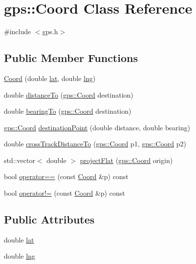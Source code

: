 \hypertarget{classgps_1_1Coord}{}\section{gps\+:\+:Coord Class Reference}
\label{classgps_1_1Coord}


{\ttfamily \#include $<$gps.\+h$>$}

\subsection*{Public Member Functions}
\begin{DoxyCompactItemize}
\item 
\hyperlink{classgps_1_1Coord_afcc45fae837b48cd7d9bd545c4dc574c}{Coord} (double \hyperlink{classgps_1_1Coord_a17cbbd7580a83c42f650b8f93e14d98e}{lat}, double \hyperlink{classgps_1_1Coord_abca98aaabe2dc3cf50ebdd687c2f47e8}{lng})
\item 
double \hyperlink{classgps_1_1Coord_a335589710eec94e6062323ef5c8994ab}{distance\+To} (\hyperlink{classgps_1_1Coord}{gps\+::\+Coord} destination)
\item 
double \hyperlink{classgps_1_1Coord_a3d3d160c28334979d220dce4112e087d}{bearing\+To} (\hyperlink{classgps_1_1Coord}{gps\+::\+Coord} destination)
\item 
\hyperlink{classgps_1_1Coord}{gps\+::\+Coord} \hyperlink{classgps_1_1Coord_ae76a605c81049d648d4e39ee0f56ff7b}{destination\+Point} (double distance, double bearing)
\item 
double \hyperlink{classgps_1_1Coord_a0efb59b2c1fa68551f118bcea3733593}{cross\+Track\+Distance\+To} (\hyperlink{classgps_1_1Coord}{gps\+::\+Coord} p1, \hyperlink{classgps_1_1Coord}{gps\+::\+Coord} p2)
\item 
std\+::vector$<$ double $>$ \hyperlink{classgps_1_1Coord_ac2e47c5d6d9a3d54a4086e8003fc7e9a}{project\+Flat} (\hyperlink{classgps_1_1Coord}{gps\+::\+Coord} origin)
\item 
bool \hyperlink{classgps_1_1Coord_a254245e5cdfbac96a1c6e0332f2d65fb}{operator==} (const \hyperlink{classgps_1_1Coord}{Coord} \&p) const
\item 
bool \hyperlink{classgps_1_1Coord_ad832b140a8a39355874e268834d078cd}{operator!=} (const \hyperlink{classgps_1_1Coord}{Coord} \&p) const
\end{DoxyCompactItemize}
\subsection*{Public Attributes}
\begin{DoxyCompactItemize}
\item 
double \hyperlink{classgps_1_1Coord_a17cbbd7580a83c42f650b8f93e14d98e}{lat}
\item 
double \hyperlink{classgps_1_1Coord_abca98aaabe2dc3cf50ebdd687c2f47e8}{lng}
\end{DoxyCompactItemize}



